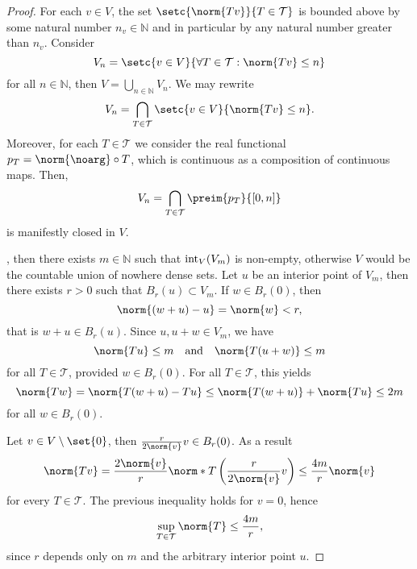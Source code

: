 \begin{proof}
    For each \(v \in V\), the set \(\setc{\norm{Tv}}{T \in \mathcal{T}}\) is bounded above by some natural number \(n_v \in \mathbb{N}\) and in particular by any natural number greater than \(n_v\). Consider
    \begin{equation*}
        V_n = \setc{v \in V}{\forall T \in \mathcal{T} : \norm{Tv} \leq n}
    \end{equation*}
    for all \(n \in \mathbb{N}\), then \(V = \bigcup_{n \in \mathbb{N}} V_n\). We may rewrite
    \begin{equation*}
        V_n = \bigcap_{T \in \mathcal{T}} \setc{v \in V}{\norm{Tv}\leq n}.
    \end{equation*}
    Moreover, for each \(T \in \mathcal{T}\) we consider the real functional \(p_T = \norm{\noarg} \circ T\), which is continuous as a composition of continuous maps. Then,
    \begin{equation*}
        V_n = \bigcap_{T \in \mathcal{T}} \preim{p_T}{[0,n]}
    \end{equation*}
    is manifestly closed in \(V\).

    , then there exists \(m \in \mathbb{N}\) such that \(\operatorname{int}_V(V_m)\) is non-empty, otherwise \(V\) would be the countable union of nowhere dense sets. Let \(u\) be an interior point of \(V_m\), then there exists \(r > 0\) such that \(B_r(u) \subset V_m\). If \(w \in B_r(0)\), then
    \begin{equation*}
        \norm{(w + u) - u} = \norm{w} < r,
    \end{equation*}
    that is \(w + u \in B_r(u)\). Since \(u, u + w \in V_m\), we have
    \begin{equation*}
        \norm{Tu} \leq m
        \quad\text{and}{\quad}
        \norm{T(u + w)} \leq m
    \end{equation*}
    for all \(T \in \mathcal{T}\), provided \(w \in B_r(0)\). For all \(T \in \mathcal{T}\), this yields
    \begin{equation*}
        \norm{Tw} = \norm{T(w + u) - Tu} \leq \norm{T(w + u)} + \norm{Tu} \leq 2m
    \end{equation*}
    for all \(w \in B_r(0)\).

    Let \(v \in V\setminus\set{0}\), then \(\frac{r}{2\norm{v}}v \in B_r(0)\). As a result
    \begin{equation*}
        \norm{Tv} = \frac{2\norm{v}}{r}\norm*{T\left(\frac{r}{2\norm{v}}v\right)} \leq \frac{4m}{r}\norm{v}
    \end{equation*}
    for every \(T \in \mathcal{T}\). The previous inequality holds for \(v = 0\), hence
    \begin{equation*}
        \sup_{T \in \mathcal{T}} \norm{T} \leq \frac{4m}{r},
    \end{equation*}
    since \(r\) depends only on \(m\) and the arbitrary interior point \(u\).
\end{proof}

